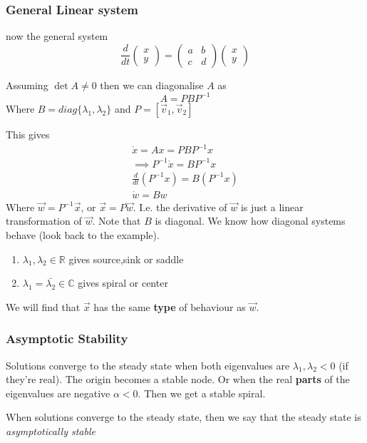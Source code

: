 \documentclass{/home/janmebows/Documents/LatexTemplates/myassignment}
\begin{document}
\subsubsection{General Linear system}
now the general system
\[\frac{d}{dt} \begin{pmatrix}
    x\\y
\end{pmatrix} = \begin{pmatrix}
a&b\\c&d
\end{pmatrix} \begin{pmatrix}
    x\\y
\end{pmatrix}\]

Assuming $\det A\neq 0$ then we can diagonalise $A$ as
\[A = PBP^{-1}\]
Where $B = diag\{\lambda_1,\lambda_2\}$ and $P = [\vec v_1,\vec v_2]$ 

This gives
\begin{align*}
    \dot x = Ax = PBP^{-1} x\\
    \implies P^{-1} \dot x = BP^{-1} x\\
    \frac{d}{dt}(P^{-1} x) = B (P^{-1} x)\\
    \dot w = B w
\end{align*}
Where $\vec w = P^{-1} \vec x$, or $\vec x = P\vec w$. I.e. the derivative of $\vec w$ is just a linear transformation of $\vec w$.
Note that $B$ is diagonal. We know how diagonal systems behave (look back to the example). 

\begin{enumerate}
    \item $\lambda_1,\lambda_2 \in \mathbb{R}$ gives source,sink or saddle
    \item $\lambda_1 = \bar{\lambda_2} \in \mathbb{C}$ gives spiral or center
\end{enumerate}

We will find that $\vec x$ has the same \textbf{type} of behaviour as $\vec w$.


\subsubsection{Asymptotic Stability}
Solutions converge to the steady state when both eigenvalues are $\lambda_1,\lambda_2 < 0$ (if they're real). The origin becomes a stable node.
Or when the real \textbf{parts} of the eigenvalues are negative $\alpha <0$. Then we get a stable spiral.

When solutions converge to the steady state, then we say that the steady state is \textit{asymptotically stable}
\end{document}
